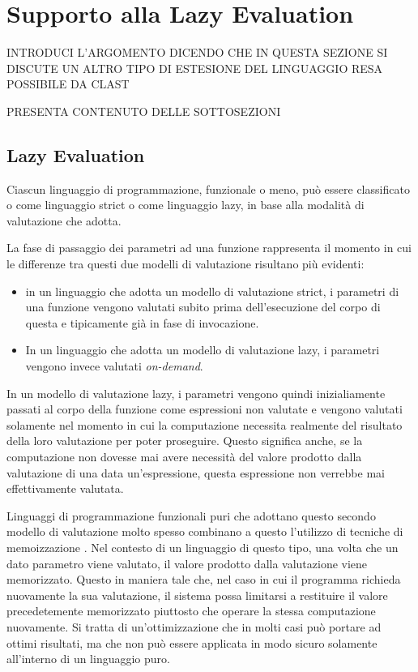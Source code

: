 \section{Supporto alla Lazy Evaluation}
\label{lazy-evaluation}

INTRODUCI L'ARGOMENTO DICENDO CHE IN QUESTA SEZIONE SI DISCUTE UN ALTRO TIPO DI ESTESIONE DEL LINGUAGGIO RESA POSSIBILE DA CLAST

PRESENTA CONTENUTO DELLE SOTTOSEZIONI

\subsection{Lazy Evaluation}

Ciascun linguaggio di programmazione, funzionale o meno, può essere classificato o come linguaggio strict o come linguaggio lazy, in base alla modalità di valutazione che adotta.

La fase di passaggio dei parametri ad una funzione rappresenta il momento in cui le differenze tra questi due modelli di valutazione risultano più evidenti:


\begin{itemize}

\item in un linguaggio che adotta un modello di valutazione strict, i parametri di una funzione vengono valutati subito prima dell'esecuzione del corpo di questa e tipicamente già in fase di invocazione.

\item In un linguaggio che adotta un modello di valutazione lazy, i parametri vengono invece valutati \textit{on-demand}.

\end{itemize}

In un modello di valutazione lazy, i parametri vengono quindi inizialiamente passati al corpo della funzione come espressioni non valutate e vengono valutati solamente nel momento in cui la computazione necessita realmente del risultato della loro valutazione per poter proseguire. Questo significa anche, se la computazione non dovesse mai avere necessità del valore prodotto dalla valutazione di una data un'espressione, questa espressione non verrebbe mai effettivamente valutata.

Linguaggi di programmazione funzionali puri che adottano questo secondo modello di valutazione molto spesso combinano a questo l'utilizzo di tecniche di memoizzazione \cite{mic68}. Nel contesto di un linguaggio di questo tipo, una volta che un dato parametro viene valutato, il valore prodotto dalla valutazione viene memorizzato. Questo in maniera tale che, nel caso in cui il programma richieda nuovamente la sua valutazione, il sistema possa limitarsi a restituire il valore precedetemente memorizzato piuttosto che operare la stessa computazione nuovamente. Si tratta di un'ottimizzazione che in molti casi può portare ad ottimi risultati, ma che non può essere applicata in modo sicuro solamente all'interno di un linguaggio puro.

